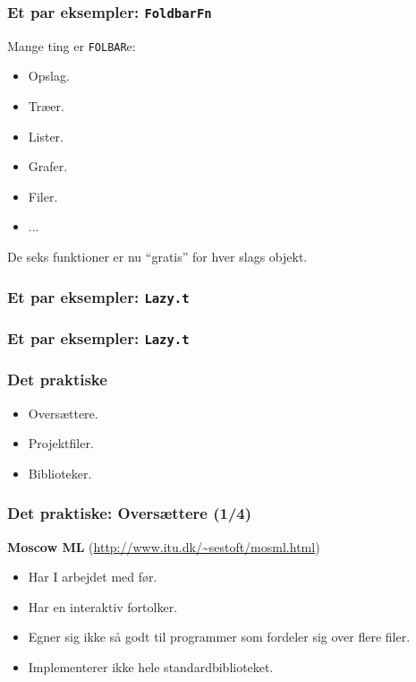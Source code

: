 \documentclass[slidestop,compress,mathserif, xcolor=table]{beamer}
\begin{document}
\begin{frame}
  \frametitle{Et par eksempler: \texttt{FoldbarFn}}

  Mange ting er \texttt{FOLBAR}e:
  \begin{itemize}
  \item Opslag.
  \item Træer.
  \item Lister.
  \item Grafer.
  \item Filer.
  \item ...
  \end{itemize}
  De seks funktioner er nu "`gratis"' for hver slags objekt.

  \begin{block}{}
    
  \end{block}
\end{frame}

\begin{frame}
  \frametitle{Et par eksempler: \texttt{Lazy.t}}

  \begin{block}{}
    
  \end{block}
\end{frame}


\begin{frame}
  \frametitle{Et par eksempler: \texttt{Lazy.t}}

  \begin{block}{}
    
  \end{block}
\end{frame}

\begin{frame}[c]
  \frametitle{Det praktiske}
  \begin{itemize}
  \item Oversættere.
  \item Projektfiler.
  \item Biblioteker.
  \end{itemize}
\end{frame}

\begin{frame}
  \frametitle{Det praktiske: Oversættere \quad (1/4)}
  \textbf{Moscow ML} {\scriptsize(\url{http://www.itu.dk/~sestoft/mosml.html})}
  \begin{itemize}
  \item Har I arbejdet med før.
  \item Har en interaktiv fortolker.
  \item Egner sig ikke så godt til programmer som fordeler sig over flere
    filer.
  \item Implementerer ikke hele standardbiblioteket.
  \end{itemize}
\end{frame}
\end{document}
